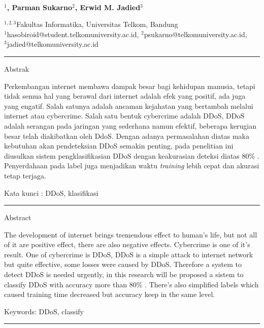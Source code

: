  
  \begin{center}
      \textbf{\large \Title}\\
      \bigskip 
  \end{center}
  
  
  
   \begin{center}
     \bf \Author$^1$, Parman Sukarno$^2$, Erwid M. Jadied$^3$ 
  \end{center}
  
  
   \begin{center}
     $^{1,2,3}$Fakultas Informatika, Universitas Telkom, Bandung\\
$^1$hasobiroid@student.telkomuniversity.ac.id, $^2$psukarno@telkomuniversity.ac.id,\\ $^3$jadied@telkomuniversity.ac.id %
  \end{center}
  
   
   
{\bf \parindent0pt \noindent\rule{\textwidth}{1pt}
Abstrak

Perkembangan internet membawa dampak besar bagi kehidupan manusia, tetapi tidak semua hal yang berawal dari internet adalah efek yang positif, ada juga yang engatif. Salah satunya adalah ancaman kejahatan yang bertambah melalui internet atau cybercrime. Salah satu bentuk cybercrime adalah DDoS, DDoS adalah serangan pada jaringan yang sederhana namun efektif, beberapa kerugian besar telah diakibatkan oleh DdoS. Dengan adanya permasalahan diatas maka kebutuhan akan pendeteksian DDoS semakin penting, pada penelitian ini diusulkan sistem pengklasifikasian DDoS dengan keakurasian deteksi diatas 80\% \cite{ddosfuzzy}\cite{ddosfpga}\cite{ddosrbf}. Penyerdahaan pada label juga menjadikan waktu \textit{training} lebih cepat dan akurasi tetap terjaga.

 \bigskip
Kata kunci : DDoS, klasifikasi




\noindent\rule{\textwidth}{1pt}
Abstract

The development of internet brings tremendous effect to human's life, but not all of it are positive effect, there are also negative effects. Cybercrime is one of it's result. One of cybercrime is DDoS, DDoS is a simple attack to internet network but quite effective, some losses were caused by DDoS. Therefore a system to detect DDoS is needed urgently, in this research will be proposed a sistem to classify DDoS with accuracy more than 80\% \cite{ddosfuzzy}\cite{ddosfpga}\cite{ddosrbf}. There's also simplified labels which caused training time decreased but accuracy keep in the same level.

 \bigskip
Keywords: DDoS, classify

\noindent\rule{\textwidth}{1pt} }



